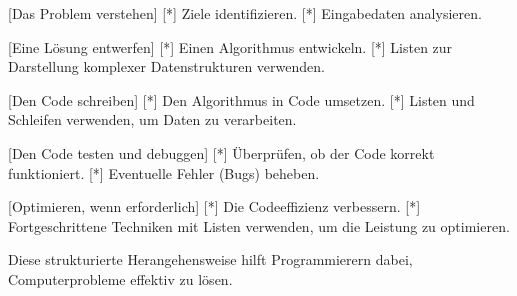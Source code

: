   [Das Problem verstehen]
    [*] Ziele identifizieren.
    [*] Eingabedaten analysieren.

  [Eine Lösung entwerfen]
    [*] Einen Algorithmus entwickeln.
    [*] Listen zur Darstellung komplexer Datenstrukturen verwenden.

  [Den Code schreiben]
    [*] Den Algorithmus in Code umsetzen.
    [*] Listen und Schleifen verwenden, um Daten zu verarbeiten.

  [Den Code testen und debuggen]
    [*] Überprüfen, ob der Code korrekt funktioniert.
    [*] Eventuelle Fehler (Bugs) beheben.

  [Optimieren, wenn erforderlich]
    [*] Die Codeeffizienz verbessern.
    [*] Fortgeschrittene Techniken mit Listen verwenden, um die Leistung zu optimieren.

  Diese strukturierte Herangehensweise hilft Programmierern dabei, Computerprobleme effektiv zu lösen.
